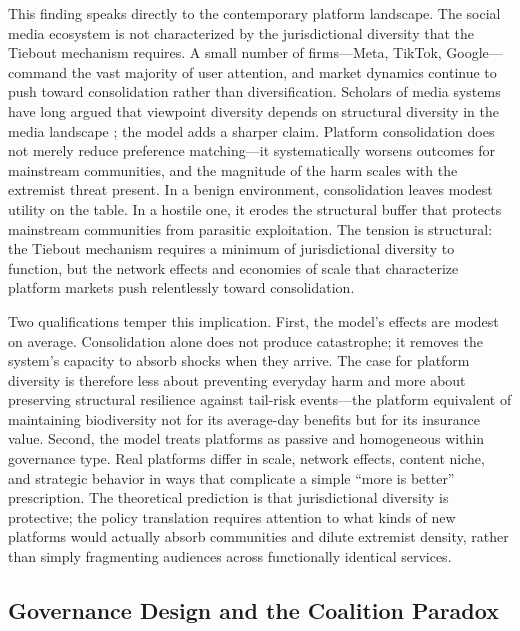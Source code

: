 This finding speaks directly to the contemporary platform landscape. The social media ecosystem is not characterized by the jurisdictional diversity that the Tiebout mechanism requires. A small number of firms---Meta, TikTok, Google---command the vast majority of user attention, and market dynamics continue to push toward consolidation rather than diversification. Scholars of media systems have long argued that viewpoint diversity depends on structural diversity in the media landscape \citep{tufekci2017twitter}; the model adds a sharper claim. Platform consolidation does not merely reduce preference matching---it systematically worsens outcomes for mainstream communities, and the magnitude of the harm scales with the extremist threat present. In a benign environment, consolidation leaves modest utility on the table. In a hostile one, it erodes the structural buffer that protects mainstream communities from parasitic exploitation. The tension is structural: the Tiebout mechanism requires a minimum of jurisdictional diversity to function, but the network effects and economies of scale that characterize platform markets push relentlessly toward consolidation.

Two qualifications temper this implication. First, the model's effects are modest on average. Consolidation alone does not produce catastrophe; it removes the system's capacity to absorb shocks when they arrive. The case for platform diversity is therefore less about preventing everyday harm and more about preserving structural resilience against tail-risk events---the platform equivalent of maintaining biodiversity not for its average-day benefits but for its insurance value. Second, the model treats platforms as passive and homogeneous within governance type. Real platforms differ in scale, network effects, content niche, and strategic behavior in ways that complicate a simple ``more is better'' prescription. The theoretical prediction is that jurisdictional diversity is protective; the policy translation requires attention to what kinds of new platforms would actually absorb communities and dilute extremist density, rather than simply fragmenting audiences across functionally identical services.

\subsection{Governance Design and the Coalition Paradox}

